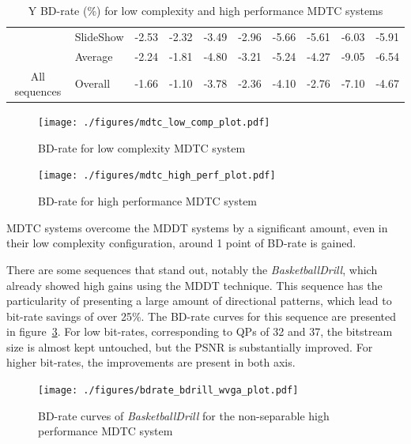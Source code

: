 \documentclass[11pt,a4paper,openright,twoside]{book}
\numberwithin{equation}{section} %
\numberwithin{figure}{section} %
\numberwithin{table}{section} %
\begin{document}
\begin{table}[tb]
\begin{tabularx}{\textwidth}{c|X|rr|rr|rr|rr}
		& SlideShow              & -2.53 & -2.32 &  -3.49 & -2.96 & -5.66 & -5.61 & -6.03  &  -5.91 \\
		\cline{2-10} &
		Average                  & -2.24 & -1.81 &  -4.80 & -3.21 & -5.24 & -4.27 & -9.05  & -6.54 \\
		\hline
		\hline
		All sequences &
		Overall                  & -1.66 & -1.10 &  -3.78 & -2.36 & -4.10 & -2.76 & -7.10  &  -4.67 \\
	\end{tabularx}
	\caption{Y \acs{BD}-rate (\%) for low complexity and high performance \acs{MDTC} systems}
	\label{tab:bd_rate_mdtc}
\end{table}

\begin{figure}[tb]
	\centering
	\texttt{[image: ./figures/mdtc\_low\_comp\_plot.pdf]}
	\caption{\acs{BD}-rate for low complexity \acs{MDTC} system}
	\label{fig:mdtc_low_comp}
\end{figure}

\begin{figure}[tb]
	\centering
	\texttt{[image: ./figures/mdtc\_high\_perf\_plot.pdf]}
	\caption{\acs{BD}-rate for high performance \acs{MDTC} system}
	\label{fig:mdtc_high_perf}
\end{figure}

\ac{MDTC} systems overcome the \ac{MDDT} systems by a significant amount,
even in their low complexity configuration, around 1 point of \ac{BD}-rate is
gained.

There are some sequences that stand out, notably the \emph{BasketballDrill},
which already showed high gains using the \ac{MDDT} technique.
This sequence has the particularity of presenting a large amount of directional
patterns, which lead to bit-rate savings of over 25\%.
The \ac{BD}-rate curves for this sequence are presented in
figure~\ref{fig:mdtc_bdrate_bdrill}.
For low bit-rates, corresponding to \acp{QP} of 32 and 37, the bitstream size
is almost kept untouched, but the \ac{PSNR} is substantially improved.
For higher bit-rates, the improvements are present in both axis.

\begin{figure}[tb]
	\centering
	\texttt{[image: ./figures/bdrate\_bdrill\_wvga\_plot.pdf]}
	\caption[\acs{BD}-rate curves for \acs{MDTC} system on
	\emph{BasketballDrill}]
	{\acs{BD}-rate curves of \emph{BasketballDrill} for the non-separable high
	performance \acs{MDTC} system}
	\label{fig:mdtc_bdrate_bdrill}
\end{figure}
\end{document}
